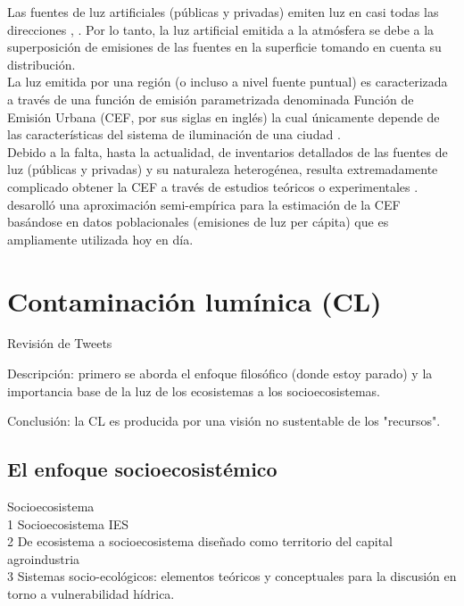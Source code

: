 Las fuentes de luz artificiales (públicas y privadas) emiten luz en casi todas las direcciones \citep{Kocifaj2014}, \citep{Kocifaj2016}. Por lo tanto, la luz artificial emitida a la atmósfera se debe a la superposición de emisiones de las fuentes en la superficie tomando en cuenta su distribución.\\

La luz emitida por una región (o incluso a nivel fuente puntual) es caracterizada a través de una función de emisión parametrizada denominada Función de Emisión Urbana (CEF, por sus siglas en inglés) la cual únicamente depende de las características del sistema de iluminación de una ciudad \citep{Kocifaj2014}.\\

Debido a la falta, hasta la actualidad, de inventarios detallados de las fuentes de luz (públicas y privadas) y su naturaleza heterogénea, resulta extremadamente complicado obtener la CEF a través de estudios teóricos o experimentales \citep{Kocifaj2014}. \cite{Garstang1986} desarolló una aproximación semi-empírica para la estimación de la CEF basándose en datos poblacionales (emisiones de luz per cápita) que es ampliamente utilizada hoy en día.\\

\section{Contaminación lumínica (CL)} 
\label{sec:contaminacionluminica}

Revisión de Tweets

Descripción: primero se aborda el enfoque filosófico (donde estoy parado) y la importancia base de la luz de los ecosistemas a los socioecosistemas.

Conclusión: la CL es producida por una visión no sustentable de los "recursos".

\subsection{El enfoque socioecosistémico}

Socioecosistema\\

1 Socioecosistema IES\\

2 De ecosistema a socioecosistema diseñado
como territorio del capital agroindustria\\

3 Sistemas socio-ecológicos: elementos teóricos y conceptuales para la discusión en torno a vulnerabilidad hídrica.\\

